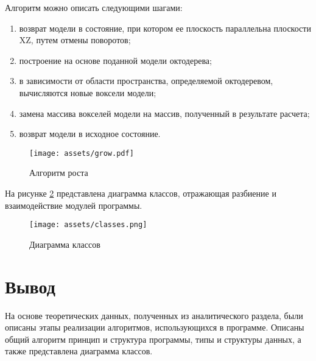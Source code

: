 Алгоритм можно описать следующими шагами:
\begin{enumerate}
	\item возврат модели в состояние, при котором ее плоскость параллельна плоскости XZ, путем отмены поворотов;
	\item построение на основе поданной модели октодерева;
	\item в зависимости от области пространства, определяемой октодеревом, вычисляются новые воксели модели;
	\item замена массива вокселей модели на массив, полученный в результате расчета;
	\item возврат модели в исходное состояние.
\end{enumerate}

\newpage

\begin{figure}[h!]
	\begin{center}
		\texttt{[image: assets/grow.pdf]}
	\end{center}
	\caption{Алгоритм роста}
	\label{classes}
\end{figure}

\newpage

На рисунке \ref{classes} представлена диаграмма классов, отражающая разбиение и взаимодействие модулей программы.

\begin{figure}[h!]
	\begin{center}
		\texttt{[image: assets/classes.png]}
	\end{center}
	\caption{Диаграмма классов}
	\label{classes}
\end{figure}

\clearpage 

\section*{Вывод}
На основе теоретических данных, полученных из аналитического раздела, были описаны этапы реализации алгоритмов, использующихся в программе. Описаны общий алгоритм принцип и структура программы, типы и структуры данных, а также представлена диаграмма классов. 
